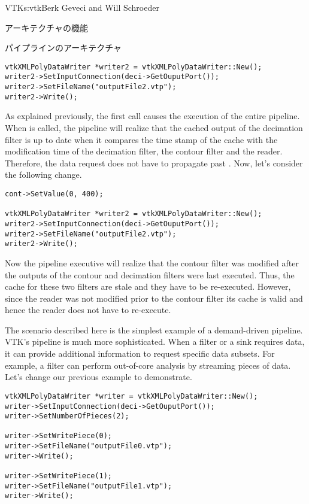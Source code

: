 \begin{aosachapter}{VTK}{s:vtk}{Berk Geveci and Will Schroeder}
\begin{aosasect1}{アーキテクチャの機能}
\begin{aosasect2}{パイプラインのアーキテクチャ}
\begin{verbatim}
vtkXMLPolyDataWriter *writer2 = vtkXMLPolyDataWriter::New();
writer2->SetInputConnection(deci->GetOuputPort());
writer2->SetFileName("outputFile2.vtp");
writer2->Write();
\end{verbatim}

As explained previously, the first 
call causes the execution of the entire pipeline. When
 is called, the pipeline will
realize that the cached output of the decimation filter is up to date
when it compares the time stamp of the cache with the modification
time of the decimation filter, the contour filter and the
reader. Therefore, the data request does not have to propagate past
. Now, let's consider the following change.

\begin{verbatim}
cont->SetValue(0, 400);

vtkXMLPolyDataWriter *writer2 = vtkXMLPolyDataWriter::New();
writer2->SetInputConnection(deci->GetOuputPort());
writer2->SetFileName("outputFile2.vtp");
writer2->Write();
\end{verbatim}

Now the pipeline executive will realize that the contour filter was
modified after the outputs of the contour and decimation filters were
last executed. Thus, the cache for these two filters are stale and
they have to be re-executed. However, since the reader was not
modified prior to the contour filter its cache is valid and hence the
reader does not have to re-execute.

The scenario described here is the simplest example of a demand-driven
pipeline. VTK's pipeline is much more sophisticated. When a filter or
a sink requires data, it can provide additional information to request
specific data subsets. For example, a filter can perform out-of-core
analysis by streaming pieces of data. Let's change our previous
example to demonstrate.

\begin{verbatim}
vtkXMLPolyDataWriter *writer = vtkXMLPolyDataWriter::New();
writer->SetInputConnection(deci->GetOuputPort());
writer->SetNumberOfPieces(2);

writer->SetWritePiece(0);
writer->SetFileName("outputFile0.vtp");
writer->Write();

writer->SetWritePiece(1);
writer->SetFileName("outputFile1.vtp");
writer->Write();
\end{verbatim}


\end{aosasect2}
\end{aosasect1}
\end{aosachapter}
